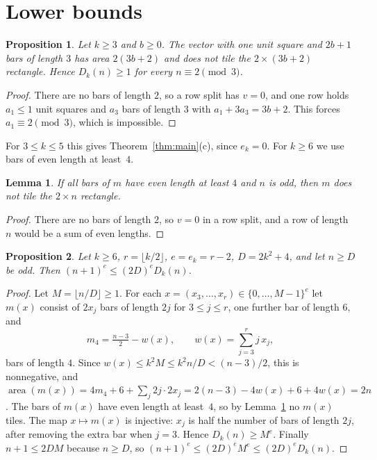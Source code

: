 \documentclass[11pt]{article}
\newtheorem{lemma}{Lemma}
\newtheorem{proposition}{Proposition}
\theoremstyle{definition}
\theoremstyle{remark}
\newcommand{\area}{\operatorname{area}}
\begin{document}
\section{Lower bounds}\label{sec:lower}

\begin{proposition}\label{prop:lower35}
Let $k\ge3$ and $b\ge0$. The vector with one unit square and $2b+1$ bars of
length $3$ has area $2(3b+2)$ and does not tile the $2\times(3b+2)$
rectangle. Hence $D_k(n)\ge1$ for every $n\equiv2\pmod 3$.
\end{proposition}

\begin{proof}
There are no bars of length $2$, so a row split has $v=0$, and one row holds
$a_1\le1$ unit squares and $a_3$ bars of length $3$ with $a_1+3a_3=3b+2$. This
forces $a_1\equiv2\pmod3$, which is impossible.
\end{proof}

\noindent For $3\le k\le5$ this gives Theorem~\ref{thm:main}(c), since
$e_k=0$. For $k\ge6$ we use bars of even length at least~$4$.

\begin{lemma}\label{lem:even}
If all bars of $m$ have even length at least $4$ and $n$ is odd, then $m$ does
not tile the $2\times n$ rectangle.
\end{lemma}

\begin{proof}
There are no bars of length $2$, so $v=0$ in a row split, and a row of length
$n$ would be a sum of even lengths.
\end{proof}

\begin{proposition}\label{prop:lower6}
Let $k\ge6$, $r=\lfloor k/2\rfloor$, $e=e_k=r-2$, $D=2k^2+4$, and let $n\ge D$
be odd. Then $(n+1)^{e}\le(2D)^{e}D_k(n)$.
\end{proposition}

\begin{proof}
Let $M=\lfloor n/D\rfloor\ge1$. For each $x=(x_3,\dots,x_r)\in\{0,\dots,M-1\}^{e}$
let $m(x)$ consist of $2x_j$ bars of length $2j$ for $3\le j\le r$, one further
bar of length $6$, and
\[
m_4=\tfrac{n-3}{2}-w(x),\qquad w(x)=\sum_{j=3}^r j\,x_j ,
\]
bars of length $4$. Since $w(x)\le k^2M\le k^2n/D<(n-3)/2$, this is
nonnegative, and
$\area(m(x))=4m_4+6+\sum_j 2j\cdot 2x_j=2(n-3)-4w(x)+6+4w(x)=2n$. The bars
of $m(x)$ have even length at least~$4$, so by Lemma~\ref{lem:even} no $m(x)$
tiles. The map $x\mapsto m(x)$ is injective: $x_j$ is half the number of bars
of length $2j$, after removing the extra bar when $j=3$. Hence
$D_k(n)\ge M^{e}$. Finally $n+1\le 2DM$ because $n\ge D$, so
$(n+1)^e\le(2D)^eM^e\le(2D)^eD_k(n)$.
\end{proof}
\end{document}
